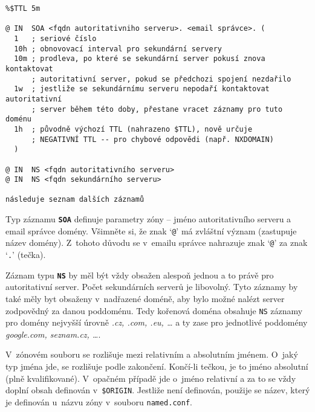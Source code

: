 \begin{verbatim}
%$TTL 5m

@ IN  SOA <fqdn autoritativniho serveru>. <email správce>. (
  1   ; seriové číslo
  10h ; obnovovací interval pro sekundární servery
  10m ; prodleva, po které se sekundární server pokusí znova kontaktovat
      ; autoritativní server, pokud se předchozi spojení nezdařilo
  1w  ; jestliže se sekundárnímu serveru nepodaří kontaktovat autoritativní
      ; server během této doby, přestane vracet záznamy pro tuto doménu
  1h  ; původně výchozí TTL (nahrazeno $TTL), nově určuje
      ; NEGATIVNÍ TTL -- pro chybové odpovědi (např. NXDOMAIN)
  )

@ IN  NS <fqdn autoritativního serveru>
@ IN  NS <fqdn sekundárního serveru>

následuje seznam dalších záznamů
\end{verbatim}
Typ záznamu {\tt\bf SOA} definuje parametry zóny -- jméno autoritativního serveru a email správce domény. Všimněte si, že znak `{\tt @}' má zvláštní význam (zastupuje název domény). Z~tohoto důvodu se v~emailu správce nahrazuje znak `{\tt @}' za znak `{\tt .}' (tečka).

Záznam typu {\tt\bf NS} by měl být vždy obsažen alespoň jednou a to právě pro autoritativní server. Počet sekundárních serverů je libovolný. Tyto záznamy by také měly byt obsaženy v~nadřazené doméně, aby bylo možné nalézt server zodpovědný za danou poddoménu. Tedy kořenová doména obsahuje {\tt NS} záznamy pro domény nejvyšší úrovně {\em .cz, .com, .eu, \dots} a ty zase pro jednotlivé poddomény {\em google.com, seznam.cz, \dots}.

V~zónovém souboru se rozlišuje mezi relativním a absolutním jménem. O~jaký typ jména jde, se rozlišuje podle zakončení. Končí-li tečkou, je to jméno absolutní (plně kvalifikované). V~opačném případě jde o~jméno relativní a za to se vždy doplní obsah definován v~{\tt \$ORIGIN}. Jestliže není definován, použije se název, který je definován u~názvu zóny v~souboru {\tt named.conf}.

